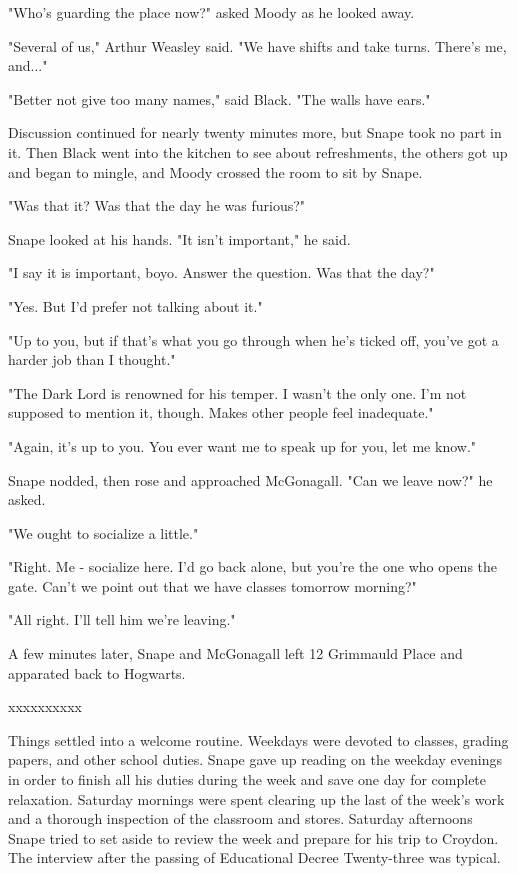 \documentclass[a4paper,11pt]{article}
\begin{document}
"Who's guarding the place now?" asked Moody as he looked away.

"Several of us," Arthur Weasley said. "We have shifts and take turns. There's me, and..."

"Better not give too many names," said Black. "The walls have ears."

Discussion continued for nearly twenty minutes more, but Snape took no part in it. Then Black went into the kitchen to see about refreshments, the others got up and began to mingle, and Moody crossed the room to sit by Snape.

"Was that it? Was that the day he was furious?"

Snape looked at his hands. "It isn't important," he said.

"I say it is important, boyo. Answer the question. Was that the day?"

"Yes. But I'd prefer not talking about it."

"Up to you, but if that's what you go through when he's ticked off, you've got a harder job than I thought."

"The Dark Lord is renowned for his temper. I wasn't the only one. I'm not supposed to mention it, though. Makes other people feel inadequate."

"Again, it's up to you. You ever want me to speak up for you, let me know."

Snape nodded, then rose and approached McGonagall. "Can we leave now?" he asked.

"We ought to socialize a little."

"Right. Me - socialize here. I'd go back alone, but you're the one who opens the gate. Can't we point out that we have classes tomorrow morning?"

"All right. I'll tell him we're leaving."

A few minutes later, Snape and McGonagall left 12 Grimmauld Place and apparated back to Hogwarts.

xxxxxxxxxx

Things settled into a welcome routine. Weekdays were devoted to classes, grading papers, and other school duties. Snape gave up reading on the weekday evenings in order to finish all his duties during the week and save one day for complete relaxation. Saturday mornings were spent clearing up the last of the week's work and a thorough inspection of the classroom and stores. Saturday afternoons Snape tried to set aside to review the week and prepare for his trip to Croydon. The interview after the passing of Educational Decree Twenty-three was typical.
\end{document}

